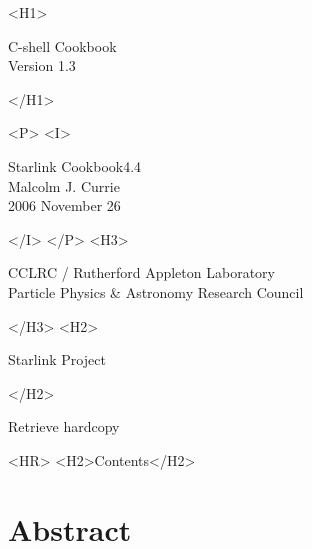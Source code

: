 \documentclass[twoside,11pt]{article}
\newcommand{\stardoccategory}  {Starlink Cookbook}
\newcommand{\stardocsource}    {sc4.4}
\newcommand{\stardocnumber}    {4.4}
\newcommand{\stardocauthors}   {Malcolm J. Currie}
\newcommand{\stardocdate}      {2006 November 26}
\newcommand{\stardoctitle}     {C-shell Cookbook}
\newcommand{\stardocversion}   {Version 1.3}
\newcommand{\stardocmanual}    {}
\newcommand{\htmladdnormallink}[2]{#1}
\newcommand{\htmladdimg}[1]{}
\newcommand{\htmlref}[2]{#1}
\newcommand{\htmladdtonavigation}[1]{}
\newcommand{\xlabel}[1]{}
\newcommand{\latexonlytoc}[0]{\tableofcontents}
\begin{document}
\begin{htmlonly}
   \xlabel{}
   \begin{rawhtml} <H1> \end{rawhtml}
      \stardoctitle\\
      \stardocversion\\
      \stardocmanual
   \begin{rawhtml} </H1> \end{rawhtml}


   \begin{rawhtml} <P> <I> \end{rawhtml}
   \stardoccategory \stardocnumber \\
   \stardocauthors \\
   \stardocdate
   \begin{rawhtml} </I> </P> <H3> \end{rawhtml}
      \htmladdnormallink{CCLRC}{http://www.cclrc.ac.uk} /
      \htmladdnormallink{Rutherford Appleton Laboratory}
                        {http://www.cclrc.ac.uk/ral} \\
      \htmladdnormallink{Particle Physics \& Astronomy Research Council}
                        {http://www.pparc.ac.uk} \\
   \begin{rawhtml} </H3> <H2> \end{rawhtml}
      \htmladdnormallink{Starlink Project}{http://star-www.rl.ac.uk/}
   \begin{rawhtml} </H2> \end{rawhtml}
   \htmladdnormallink{\htmladdimg{source.gif} Retrieve hardcopy}
      {http://star-www.rl.ac.uk/cgi-bin/hcserver?\stardocsource}\\

  \label{stardoccontents}
  \begin{rawhtml} 
    <HR>
    <H2>Contents</H2>
  \end{rawhtml}
  \newcommand{\latexonlytoc}[0]{}
  \htmladdtonavigation{\htmlref{\htmladdimg{contents_motif.gif}}
        {stardoccontents}}

  \section{\xlabel{abstract}Abstract}
\end{htmlonly}
\end{document}

